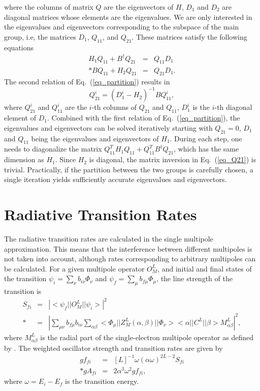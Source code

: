 where the columns of matrix $Q$ are the eigenvectors of $H$, $D_1$ and $D_2$
are diagonal matrices whose elements are the eigenvalues. We are only
interested in the eigenvalues and eigenvectors corresponding to the subspace
of the main group, i.e, the matrices $D_1$, $Q_{11}$, and $Q_{21}$. These
matrices satisfy the following equations
\begin{eqnarray}
\label{eq_partition}
H_1 Q_{11} + B^{\dagger}Q_{21} &=&  Q_{11} D_1 \nonumber \\*
B Q_{11} + H_2 Q_{21} &=& Q_{21} D_1 .
\end{eqnarray}
The second relation of Eq.~(\ref{eq_partition}) results in 
\begin{equation}
\label{eq_Q21}
Q_{21}^{i} = (D_1^{i} - H_2)^{-1}B Q_{11}^{i},
\end{equation}
where $Q_{21}^{i}$ and $Q_{11}^{i}$ are the $i$-th columns of $Q_{21}$ and
$Q_{11}$, $D_1^{i}$ is the $i$-th diagonal element of $D_1$. Combined with the
first relation of Eq.~(\ref{eq_partition}), the eigenvalues and
eigenvectors can 
be solved iteratively starting with $Q_{21} = 0$, $D_1$ and $Q_{11}$ being the
eigenvalues and eigenvectors of $H_1$. During each step, one needs to
diagonalize the matrix $Q_{11}^{T} H_1 Q_{11} + Q_{11}^{T}B^{\dagger}Q_{21}$,
which has the same dimension as $H_1$. Since $H_2$ is diagonal, the matrix
inversion in Eq.~(\ref{eq_Q21}) is trivial. Practically, if the partition
between the two groups is carefully chosen, a single iteration yields
sufficiently accurate eigenvalues and eigenvectors.

\section{Radiative Transition Rates}
The radiative transition rates are calculated in the single multipole
approximation. This means that the interference between different multipoles
is not taken into account, although rates corresponding to arbitrary
multipoles can be calculated. For a given multipole operator $O^L_M$, and
initial and final states of 
the transition $\psi_i = \sum_\nu b_{i\nu}\Phi_\nu$ and $\psi_f = \sum_\mu
b_{f\mu}\Phi_\mu$, the line strength of the transition is 
\begin{eqnarray}
S_{fi} &=& \left|<\psi_f||O^L_M||\psi_i>\right|^2 \nonumber\\*
&=& \left|\sum_{\mu\nu}b_{f\mu}b_{i\nu}\sum_{\alpha\beta}
<\Phi_\mu||Z^L_M(\alpha,\beta)||\Phi_\nu><\alpha||C^L||\beta>
M^L_{\alpha\beta}\right|^2 ,
\end{eqnarray} 
where $M^L_{\alpha\beta}$ is the radial part of the single-electron multipole
operator as defined by \citet{grant:1974a}.
The weighted oscillator strength and transition rates are given by 
\begin{eqnarray}
gf_{fi} &=& [L]^{-1}\omega(\alpha\omega)^{2L-2} S_{fi} \\*
gA_{fi} &=& 2\alpha^3 \omega^2 gf_{fi},
\end{eqnarray}
where $\omega = E_i - E_f$ is the transition energy. 

